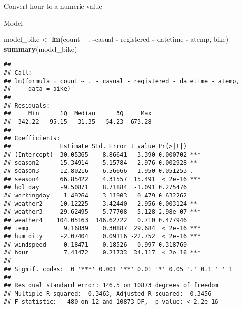\documentclass[]{article}
\newenvironment{Shaded}{\begin{snugshade}}{\end{snugshade}}
\newcommand{\KeywordTok}[1]{\textcolor[rgb]{0.13,0.29,0.53}{\textbf{#1}}}
\newcommand{\StringTok}[1]{\textcolor[rgb]{0.31,0.60,0.02}{#1}}
\newcommand{\OperatorTok}[1]{\textcolor[rgb]{0.81,0.36,0.00}{\textbf{#1}}}
\newcommand{\NormalTok}[1]{#1}
\begin{document}
Convert hour to a numeric value

\begin{Shaded}
\end{Shaded}

Model

\begin{Shaded}
\begin{Highlighting}[]
\NormalTok{model_bike <-}\StringTok{ }\KeywordTok{lm}\NormalTok{(count }\OperatorTok{~}\StringTok{ }\NormalTok{. }\OperatorTok{-}\NormalTok{casual }\OperatorTok{-}\StringTok{ }\NormalTok{registered }\OperatorTok{-}\StringTok{ }\NormalTok{datetime }\OperatorTok{-}\StringTok{ }\NormalTok{atemp, bike)}
\KeywordTok{summary}\NormalTok{(model_bike)}
\end{Highlighting}
\end{Shaded}

\begin{verbatim}
## 
## Call:
## lm(formula = count ~ . - casual - registered - datetime - atemp, 
##     data = bike)
## 
## Residuals:
##     Min      1Q  Median      3Q     Max 
## -342.22  -96.15  -31.35   54.23  673.28 
## 
## Coefficients:
##              Estimate Std. Error t value Pr(>|t|)    
## (Intercept)  30.05365    8.86641   3.390 0.000702 ***
## season2      15.34914    5.15784   2.976 0.002928 ** 
## season3     -12.80216    6.56666  -1.950 0.051253 .  
## season4      66.85422    4.31557  15.491  < 2e-16 ***
## holiday      -9.50871    8.71884  -1.091 0.275476    
## workingday   -1.49264    3.11903  -0.479 0.632262    
## weather2     10.12225    3.42440   2.956 0.003124 ** 
## weather3    -29.62495    5.77708  -5.128 2.98e-07 ***
## weather4    104.05163  146.62722   0.710 0.477946    
## temp          9.16839    0.30887  29.684  < 2e-16 ***
## humidity     -2.07404    0.09116 -22.752  < 2e-16 ***
## windspeed     0.18471    0.18526   0.997 0.318769    
## hour          7.41472    0.21733  34.117  < 2e-16 ***
## ---
## Signif. codes:  0 '***' 0.001 '**' 0.01 '*' 0.05 '.' 0.1 ' ' 1
## 
## Residual standard error: 146.5 on 10873 degrees of freedom
## Multiple R-squared:  0.3463, Adjusted R-squared:  0.3456 
## F-statistic:   480 on 12 and 10873 DF,  p-value: < 2.2e-16
\end{verbatim}
\end{document}
